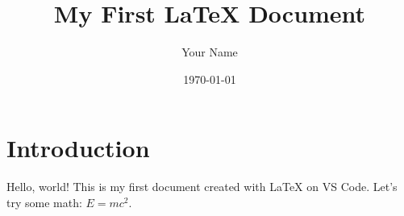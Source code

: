 \documentclass{article}
\title{My First LaTeX Document}
\author{Your Name}
\date{\today}
\begin{document}
\maketitle

\section{Introduction}
Hello, world! This is my first document created with LaTeX on VS Code.
Let's try some math: $E = mc^2$.
\end{document}
